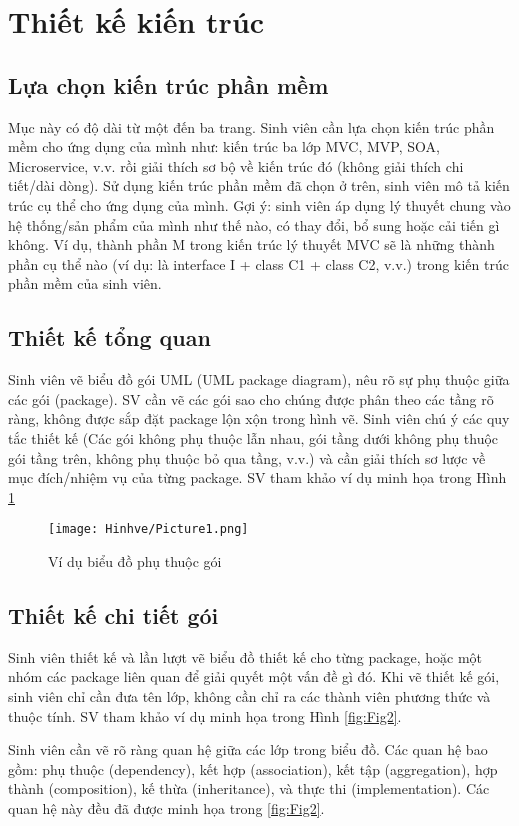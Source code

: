\documentclass[../DoAn.tex]{subfiles}
\begin{document}
\section{Thiết kế kiến trúc}
\subsection{Lựa chọn kiến trúc phần mềm}
Mục này có độ dài từ một đến ba trang. Sinh viên cần lựa chọn kiến trúc phần mềm cho ứng dụng của mình như: kiến trúc ba lớp MVC, MVP, SOA, Microservice, v.v. rồi giải thích sơ bộ về kiến trúc đó (không giải thích chi tiết/dài dòng).
Sử dụng kiến trúc phần mềm đã chọn ở trên, sinh viên mô tả kiến trúc cụ thể cho ứng dụng của mình. Gợi ý: sinh viên áp dụng lý thuyết chung vào hệ thống/sản phẩm của mình như thế nào, có thay đổi, bổ sung hoặc cải tiến gì không. Ví dụ, thành phần M trong kiến trúc lý thuyết MVC sẽ là những thành phần cụ thể nào (ví dụ: là interface I + class C1 + class C2, v.v.) trong kiến trúc phần mềm của sinh viên.

\subsection{Thiết kế tổng quan}
Sinh viên vẽ biểu đồ gói UML (UML package diagram), nêu rõ sự phụ thuộc giữa các gói (package). SV cần vẽ các gói sao cho chúng được phân theo các tầng rõ ràng, không được sắp đặt package lộn xộn trong hình vẽ. Sinh viên chú ý các quy tắc thiết kế (Các gói không phụ thuộc lẫn nhau, gói tầng dưới không phụ thuộc gói tầng trên, không phụ thuộc bỏ qua tầng, v.v.) và cần giải thích sơ lược về mục đích/nhiệm vụ của từng package. SV tham khảo ví dụ minh họa trong Hình \ref{fig:Fig1}
\begin{figure}[H]
    \centering
    \texttt{[image: Hinhve/Picture1.png]}
    \caption{Ví dụ biểu đồ phụ thuộc gói}
    \label{fig:Fig1}
\end{figure}
\subsection{Thiết kế chi tiết gói}
Sinh viên thiết kế và lần lượt vẽ biểu đồ thiết kế cho từng package, hoặc một nhóm các package liên quan để giải quyết một vấn đề gì đó. Khi vẽ thiết kế gói, sinh viên chỉ cần đưa tên lớp, không cần chỉ ra các thành viên phương thức và thuộc tính. SV tham khảo ví dụ minh họa trong Hình \ref{fig:Fig2}.

Sinh viên cần vẽ rõ ràng quan hệ giữa các lớp trong biểu đồ. Các quan hệ bao gồm: phụ thuộc (dependency), kết hợp (association), kết tập (aggregation), hợp thành (composition), kế thừa (inheritance), và thực thi (implementation). Các quan hệ này đều đã được minh họa trong \ref{fig:Fig2}.
\end{document}
